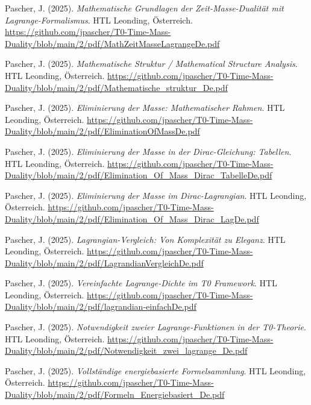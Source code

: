 \documentclass{article}
\begin{document}
\begin{thebibliography}{99}
		Pascher, J. (2025).
		\textit{Mathematische Grundlagen der Zeit-Masse-Dualität mit Lagrange-Formalismus}.
		HTL Leonding, Österreich.
		\url{https://github.com/jpascher/T0-Time-Mass-Duality/blob/main/2/pdf/MathZeitMasseLagrangeDe.pdf}
		
		Pascher, J. (2025).
		\textit{Mathematische Struktur / Mathematical Structure Analysis}.
		HTL Leonding, Österreich.
		\url{https://github.com/jpascher/T0-Time-Mass-Duality/blob/main/2/pdf/Mathematische_struktur_De.pdf}
		
		Pascher, J. (2025).
		\textit{Eliminierung der Masse: Mathematischer Rahmen}.
		HTL Leonding, Österreich.
		\url{https://github.com/jpascher/T0-Time-Mass-Duality/blob/main/2/pdf/EliminationOfMassDe.pdf}
		
		Pascher, J. (2025).
		\textit{Eliminierung der Masse in der Dirac-Gleichung: Tabellen}.
		HTL Leonding, Österreich.
		\url{https://github.com/jpascher/T0-Time-Mass-Duality/blob/main/2/pdf/Elimination_Of_Mass_Dirac_TabelleDe.pdf}
		
		Pascher, J. (2025).
		\textit{Eliminierung der Masse im Dirac-Lagrangian}.
		HTL Leonding, Österreich.
		\url{https://github.com/jpascher/T0-Time-Mass-Duality/blob/main/2/pdf/Elimination_Of_Mass_Dirac_LagDe.pdf}
		
		
		Pascher, J. (2025).
		\textit{Lagrangian-Vergleich: Von Komplexität zu Eleganz}.
		HTL Leonding, Österreich.
		\url{https://github.com/jpascher/T0-Time-Mass-Duality/blob/main/2/pdf/LagrandianVergleichDe.pdf}
		
		Pascher, J. (2025).
		\textit{Vereinfachte Lagrange-Dichte im T0 Framework}.
		HTL Leonding, Österreich.
		\url{https://github.com/jpascher/T0-Time-Mass-Duality/blob/main/2/pdf/lagrandian-einfachDe.pdf}
		
		Pascher, J. (2025).
		\textit{Notwendigkeit zweier Lagrange-Funktionen in der T0-Theorie}.
		HTL Leonding, Österreich.
		\url{https://github.com/jpascher/T0-Time-Mass-Duality/blob/main/2/pdf/Notwendigkeit_zwei_lagrange_De.pdf}
		
		Pascher, J. (2025).
		\textit{Vollständige energiebasierte Formelsammlung}.
		HTL Leonding, Österreich.
		\url{https://github.com/jpascher/T0-Time-Mass-Duality/blob/main/2/pdf/Formeln_Energiebasiert_De.pdf}
		

\end{thebibliography}
\end{document}
